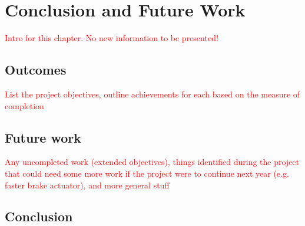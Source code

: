 \documentclass[main.tex]{subfiles}
\begin{document}
\chapter{Conclusion and Future Work}
\textcolor{red}{Intro for this chapter. No new information to be presented!}

\section{Outcomes}
\textcolor{red}{List the project objectives, outline achievements for each based on the measure of completion}

\section{Future work}
\textcolor{red}{Any uncompleted work (extended objectives), things identified during the project that could need some more work if the project were to continue next year (e.g. faster brake actuator), and more general stuff}

\section{Conclusion}
\end{document}
